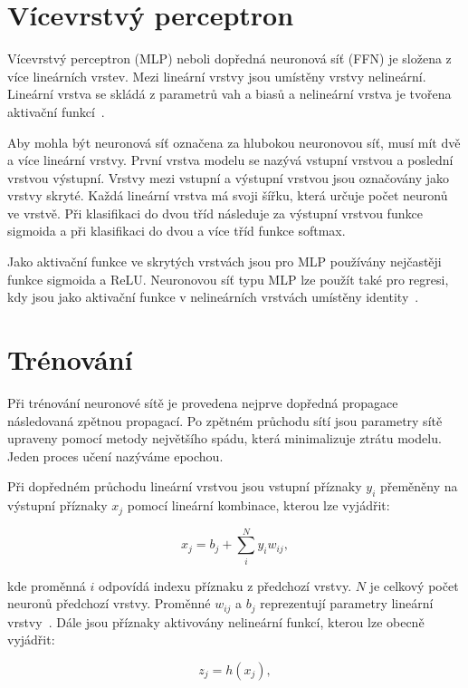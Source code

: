 \documentclass[FM,BP]{tulthesis}
\begin{document}
\section{Vícevrstvý perceptron} %
Vícevrstvý perceptron (MLP) neboli dopředná neuronová síť (FFN) je složena z více lineárních vrstev. Mezi lineární vrstvy jsou umístěny vrstvy nelineární. Lineární vrstva se skládá z parametrů vah a biasů a nelineární vrstva je tvořena aktivační funkcí~\cite{DBLP:books/lib/Bishop07}.

Aby mohla být neuronová síť označena za hlubokou neuronovou síť, musí mít dvě a více lineární vrstvy. První vrstva modelu se nazývá vstupní vrstvou a poslední vrstvou výstupní. Vrstvy mezi vstupní a výstupní vrstvou jsou označovány jako vrstvy skryté. Každá lineární vrstva má svoji šířku, která určuje počet neuronů ve vrstvě. Při klasifikaci do dvou tříd následuje za výstupní vrstvou funkce sigmoida a při klasifikaci do dvou a více tříd funkce softmax.

Jako aktivační funkce ve skrytých vrstvách jsou pro MLP používány nejčastěji funkce sigmoida a ReLU. Neuronovou síť typu MLP lze použít také pro regresi, kdy jsou jako aktivační funkce v nelineárních vrstvách umístěny identity~\cite{DBLP:books/lib/Bishop07}.

\section{Trénování} %
Při trénování neuronové sítě je provedena nejprve dopředná propagace následovaná zpětnou propagací. Po zpětném průchodu sítí jsou parametry sítě upraveny pomocí metody největšího spádu, která minimalizuje ztrátu modelu. Jeden proces učení nazýváme epochou.

Při dopředném průchodu lineární vrstvou jsou vstupní příznaky $ y_i $ přeměněny na výstupní příznaky $ x_j $ pomocí lineární kombinace, kterou lze vyjádřit:

\begin{equation}
\label{eqn:linear_layer}
x_j = b_j + \sum_{i}^{N} y_i w_{ij},
\end{equation}

kde proměnná $ i $ odpovídá indexu příznaku z předchozí vrstvy. $ N $ je celkový počet neuronů předchozí vrstvy. Proměnné $ w_{ij} $ a $ b_j $ reprezentují parametry lineární vrstvy~\cite{MATEJU2021327}. Dále jsou příznaky aktivovány nelineární funkcí, kterou lze obecně vyjádřit:

\begin{equation}
\label{eqn:activation}
z_j = h(x_j),
\end{equation}
\end{document}
